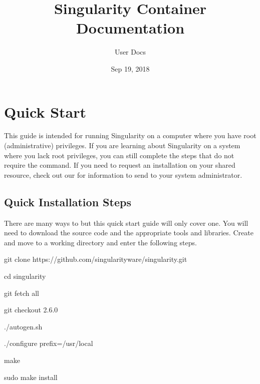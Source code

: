 \documentclass[letterpaper,10pt,english]{sphinxmanual}
\title{Singularity Container Documentation}
\date{Sep 19, 2018}
\author{User Docs}
\begin{document}
\maketitle
\sphinxtableofcontents
{}\label{\detokenize{index::doc}}



\chapter{Quick Start}
\label{\detokenize{quick_start:quick-start}}\label{\detokenize{quick_start:id1}}\label{\detokenize{quick_start::doc}}\label{\detokenize{quick_start:sec-quickstart}}
This guide is intended for running Singularity on a computer where you
have root (administrative) privileges. If you are learning about
Singularity on a system where you lack root privileges, you can still
complete the steps that do not require the  command. If you need to
request an installation on your shared resource, check out our {\hyperref[\detokenize{installation:installation-request}]{}} for information to send to your
system administrator.


\section{Quick Installation Steps}
\label{\detokenize{quick_start:quick-installation-steps}}\label{\detokenize{quick_start:quick-installation}}
There are many ways to {\hyperref[\detokenize{installation:installation}]{}} but this quick start guide will only cover one.
You will need  to download the source code and the appropriate tools and libraries. Create and move to a working directory and enter the following steps.

%
\begin{sphinxVerbatim}[commandchars=\\\{\}]
git clone https://github.com/singularityware/singularity.git

cd singularity

git fetch \PYGZhy{}\PYGZhy{}all

git checkout 2.6.0

./autogen.sh

./configure \PYGZhy{}\PYGZhy{}prefix=/usr/local

make

sudo make install
\end{sphinxVerbatim}
\end{document}
